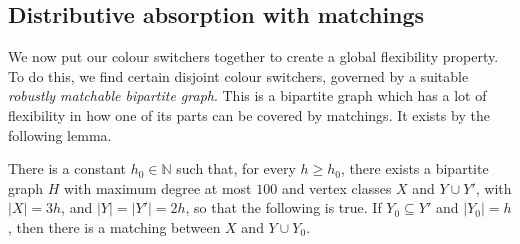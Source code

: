 \subsection{Distributive absorption with matchings}
We now put our colour switchers together to create a global flexibility property. To do this, we find certain disjoint colour switchers, governed by a suitable \emph{robustly matchable bipartite graph}.
This is a bipartite graph which has a lot of flexibility in how one of its parts can be covered by matchings. It exists by the following lemma.
\begin{lemma}\label{Lemma_H_graph}
There is a constant $h_0 \in \mathbb N$ such that, for every $h \geq h_0$, there exists
a bipartite graph $H$ with maximum degree at most $100$ and vertex classes $X$ and $Y \cup Y'$, with
$|X| = 3h$, and $|Y| = |Y'| = 2h$, so that the following is true. If $Y_0 \subseteq Y'$ and $|Y_0 | = h$, then
there is a matching between $X$ and $Y \cup Y_0$.
\end{lemma}



